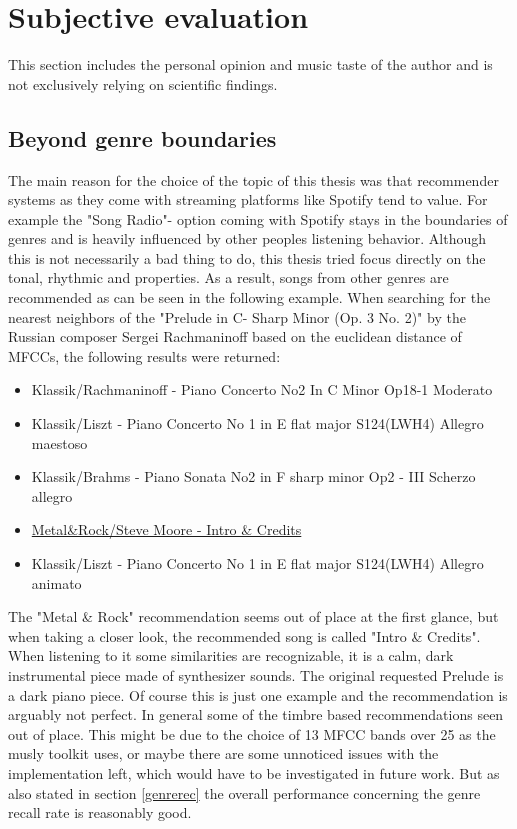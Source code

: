 \section{Subjective evaluation}

This section includes the personal opinion and music taste of the author and is not exclusively relying on scientific findings. 

\subsection{Beyond genre boundaries}

The main reason for the choice of the topic of this thesis was that recommender systems as they come with streaming platforms like Spotify tend to value. For example the "Song Radio"- option coming with Spotify stays in the boundaries of genres and is heavily influenced by other peoples listening behavior. Although this is not necessarily a bad thing to do, this thesis tried focus directly on the tonal, rhythmic and properties. As a result, songs from other genres are recommended as can be seen in the following example. 
\noindent When searching for the nearest neighbors of the "Prelude in C- Sharp Minor (Op. 3 No. 2)" by the Russian composer Sergei Rachmaninoff based on the euclidean distance of MFCCs, the following results were returned: 

\begin{itemize}
	\setlength\itemsep{-0.5em}
	\item Klassik/Rachmaninoff - Piano Concerto No2 In C Minor Op18-1 Moderato
	\item Klassik/Liszt - Piano Concerto No 1 in E flat major S124(LWH4) Allegro maestoso
	\item Klassik/Brahms - Piano Sonata No2 in F sharp minor Op2 - III Scherzo allegro
	\item \underline{Metal\&Rock/Steve Moore - Intro \& Credits}
	\item Klassik/Liszt - Piano Concerto No 1 in E flat major S124(LWH4) Allegro animato
\end{itemize}

\noindent The "Metal \& Rock" recommendation seems out of place at the first glance, but when taking a closer look, the recommended song is called "Intro \& Credits". When listening to it some similarities are recognizable, it is a calm, dark instrumental piece made of synthesizer sounds. The original requested Prelude is a dark piano piece. Of course this is just one example and the recommendation is arguably not perfect. In general some of the timbre based recommendations seen out of place. This might be due to the choice of 13 MFCC bands over 25 as the musly toolkit uses, or maybe there are some unnoticed issues with the implementation left, which would have to be investigated in future work. But as also stated in section \ref{genrerec} the overall performance concerning the genre recall rate is reasonably good.

